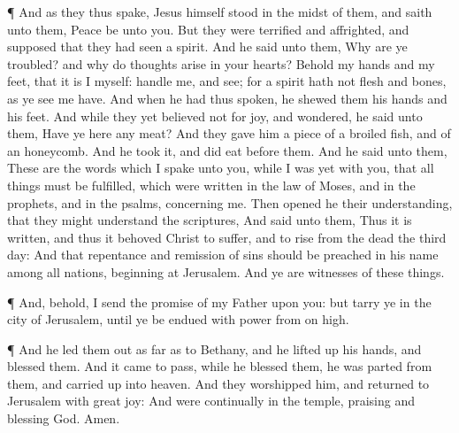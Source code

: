  ¶ And as they thus spake, Jesus himself stood in the midst
of them, and saith unto them, Peace be unto you.  But they
were terrified and affrighted, and supposed that they had seen a spirit.
 And he said unto them, Why are ye troubled? and why do
thoughts arise in your hearts?  Behold my hands and my
feet, that it is I myself: handle me, and see; for a spirit hath not
flesh and bones, as ye see me have.  And when he had thus
spoken, he shewed them his hands and his feet.  And while
they yet believed not for joy, and wondered, he said unto them, Have ye
here any meat?  And they gave him a piece of a broiled
fish, and of an honeycomb.  And he took it, and did eat
before them.  And he said unto them, These are the words
which I spake unto you, while I was yet with you, that all things must
be fulfilled, which were written in the law of Moses, and in the
prophets, and in the psalms, concerning me.  Then opened he
their understanding, that they might understand the scriptures,
 And said unto them, Thus it is written, and thus it
behoved Christ to suffer, and to rise from the dead the third day:
 And that repentance and remission of sins should be
preached in his name among all nations, beginning at Jerusalem.
 And ye are witnesses of these things.

 ¶ And, behold, I send the promise of my Father upon you:
but tarry ye in the city of Jerusalem, until ye be endued with power
from on high.

 ¶ And he led them out as far as to Bethany, and he lifted
up his hands, and blessed them.  And it came to pass, while
he blessed them, he was parted from them, and carried up into heaven.
 And they worshipped him, and returned to Jerusalem with
great joy:  And were continually in the temple, praising
and blessing God. Amen.
